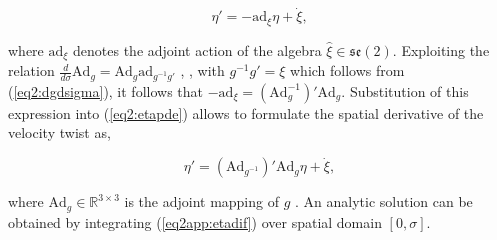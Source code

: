 \begin{equation}
    \eta'= -\text{ad}_\xi \eta + \Dot{\xi},
    \label{eq2:etapde}
\end{equation}

where $\text{ad}_\xi$ denotes the adjoint action of the algebra $\hat{\xi} \in \mathfrak{se}(2)$. Exploiting the relation $\frac{d}{d \sigma} \text{Ad}_g = \text{Ad}_g \text{ad}_{g^{-1}g'}$ \cite{Boyer2019}, \cite{traversaro2016multibody}, with $g^{-1}g' = \xi$ which follows from (\ref{eq2:dgdsigma}), it follows that $-\text{ad}_\xi = (\text{Ad}_g^{-1})'\text{Ad}_g$. Substitution of this expression into (\ref{eq2:etapde}) allows to formulate the spatial derivative of the velocity twist as,

\begin{equation}
    \eta'= (\text{Ad}_{g^{-1}})'\text{Ad}_g \eta + \Dot{\xi},
    \label{eq2app:etadif}
\end{equation}

where $\text{Ad}_g \in \mathbb{R}^{3 \times 3}$ is the adjoint mapping of $g$ \cite{Sola2018}. An analytic solution can be obtained by integrating (\ref{eq2app:etadif}) over spatial domain $[0,\sigma]$. 